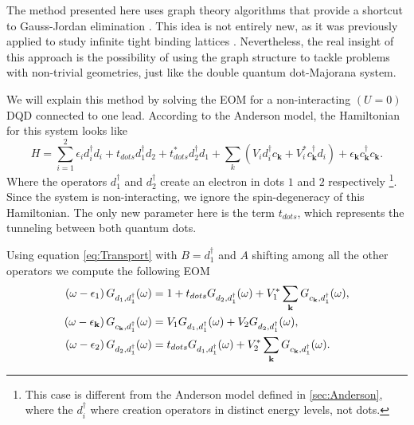 The method presented here uses graph theory algorithms that provide a shortcut to Gauss-Jordan elimination \cite{spielman10}. This idea is not entirely new, as it was previously applied to study infinite tight binding lattices \cite{AOKI1982538}. Nevertheless, the real insight of this approach is the possibility of using the graph structure to tackle problems with non-trivial geometries, just like the double quantum dot-Majorana system.  

We will explain this method by solving the EOM for a non-interacting $(U=0)$ DQD connected to one lead. According to the Anderson model, the Hamiltonian for this system looks like 
\begin{equation}
    H=\sum_{i=1}^2\epsilon_{i}d_{i}^{\dagger}d_{i}+ t_{dots}d_{1}^{\dagger}d_{2}+t_{dots}^*d_{2}^{\dagger}d_{1}+\sum_{k}\left(V_{i}d_{i}^{\dagger}c_{\mathbf{k}}+V_{i}^{*}c_{\mathbf{k}}^{\dagger}d_{i}\right) + \epsilon_{\mathbf{k}}c_{\mathbf{k}}^{\dagger}c_{\mathbf{k}}.
    \label{eq:HDQD}
\end{equation} 
\noindent Where the operators $d^\dagger_1$ and $d^\dagger_2$ create an electron in dots $1$ and $2$ respectively \footnote{This case is different from the Anderson model defined in \ref{sec:Anderson}, where the $d^\dagger_i$ where creation operators in distinct energy levels, not dots.}. Since the system is non-interacting, we ignore the spin-degeneracy of this Hamiltonian.   The only new parameter here is the term $t_{dots}$, which represents the tunneling between both quantum dots. 

 Using equation \eqref{eq:Transport} with $B = d_1^\dagger$ and $A$ shifting among all the other operators we compute the following  EOM
\begin{align}
     \left(\omega-\epsilon_{1}\right)G_{d_{1},d_{1}^{\dagger}}(\omega)&=1+t_{dots}G_{d_{2},d_{1}^{\dagger}}(\omega)+V_{1}^{*}\sum_{\mathbf{k}}G_{c_{\mathbf{k}},d_{1}^{\dagger}}(\omega), \label{eq:green1}  \\
     \left(\omega-\epsilon_{\mathbf{k}}\right)G_{c_{\mathbf{k}},d_{1}^{\dagger}}(\omega) &= V_{1}G_{d_{1},d_{1}^{\dagger}}(\omega)+V_{2}G_{d_{2},d_{1}^{\dagger}}(\omega), \label{eq:green2} \\
     \left(\omega-\epsilon_{2}\right)G_{d_{2},d_{1}^{\dagger}}(\omega)&= t_{dots}G_{d_{1},d_{1}^{\dagger}}(\omega)+V_{2}^{*}\sum_{\mathbf{k}}G_{c_{\mathbf{k}},d_{1}^{\dagger}}(\omega). \label{eq:green3} 
\end{align}

